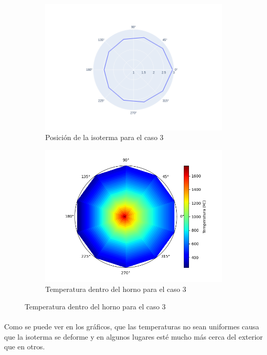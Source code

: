 \documentclass[12pt]{article}
\begin{document}
\begin{figure}[H]
\centering
\begin{subfigure}{0.5\textwidth}
  \includegraphics[scale=0.4]{uniform.2.isotherm}
  \caption{Posición de la isoterma para el caso 3}
\end{subfigure}%
\begin{subfigure}{0.5\textwidth}
  \includegraphics[scale=0.5]{uniform.2.temperature}
  \caption{Temperatura dentro del horno para el caso 3}
\end{subfigure}
\label{fig:uniform.2}
\end{figure}

\paragraph{} Como se puede ver en los gráficos, que las temperaturas no sean uniformes causa que la isoterma se deforme y en algunos lugares esté mucho más cerca del exterior que en otros.
\end{document}
